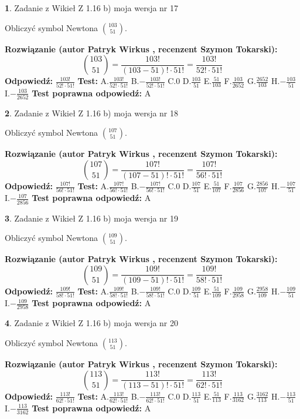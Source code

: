 \documentclass[12pt, a4paper]{article}
\theoremstyle{definition} %
\newtheorem{zad}{}
\newcommand{\zadStart}[1]{\begin{zad}#1\newline}
\newcommand{\zadStop}{\end{zad}}
\newcommand{\rozwStart}[2]{\noindent \textbf{Rozwiązanie (autor #1 , recenzent #2): }\newline}
\newcommand{\rozwStop}{\newline}
\newcommand{\odpStart}{\noindent \textbf{Odpowiedź:}\newline}
\newcommand{\odpStop}{\newline}
\newcommand{\testStart}{\noindent \textbf{Test:}\newline}
\newcommand{\testStop}{\newline}
\newcommand{\kluczStart}{\noindent \textbf{Test poprawna odpowiedź:}\newline}
\newcommand{\kluczStop}{\newline}
\begin{document}
\zadStart{Zadanie z Wikieł Z 1.16 b) moja wersja nr 17}

Obliczyć symbol Newtona ${103 \choose 51}$.
\zadStop
\rozwStart{Patryk Wirkus}{Szymon Tokarski}
$${103 \choose 51} = \frac{103!}{(103-51)! \cdot 51!} = \frac{103!}{52! \cdot 51!}$$
\rozwStop
\odpStart
$\frac{103!}{52! \cdot 51!}$
\odpStop
\testStart
A.$\frac{103!}{52! \cdot 51!}$ B.$-\frac{103!}{52! \cdot 51!}$ C.$0$ D.$\frac{103}{51}$ E.$\frac{51}{103}$
F.$\frac{103}{2652}$ G.$\frac{2652}{103}$
H.$-\frac{103}{51}$
I.$-\frac{103}{2652}$
\testStop
\kluczStart
A
\kluczStop



\zadStart{Zadanie z Wikieł Z 1.16 b) moja wersja nr 18}

Obliczyć symbol Newtona ${107 \choose 51}$.
\zadStop
\rozwStart{Patryk Wirkus}{Szymon Tokarski}
$${107 \choose 51} = \frac{107!}{(107-51)! \cdot 51!} = \frac{107!}{56! \cdot 51!}$$
\rozwStop
\odpStart
$\frac{107!}{56! \cdot 51!}$
\odpStop
\testStart
A.$\frac{107!}{56! \cdot 51!}$ B.$-\frac{107!}{56! \cdot 51!}$ C.$0$ D.$\frac{107}{51}$ E.$\frac{51}{107}$
F.$\frac{107}{2856}$ G.$\frac{2856}{107}$
H.$-\frac{107}{51}$
I.$-\frac{107}{2856}$
\testStop
\kluczStart
A
\kluczStop



\zadStart{Zadanie z Wikieł Z 1.16 b) moja wersja nr 19}

Obliczyć symbol Newtona ${109 \choose 51}$.
\zadStop
\rozwStart{Patryk Wirkus}{Szymon Tokarski}
$${109 \choose 51} = \frac{109!}{(109-51)! \cdot 51!} = \frac{109!}{58! \cdot 51!}$$
\rozwStop
\odpStart
$\frac{109!}{58! \cdot 51!}$
\odpStop
\testStart
A.$\frac{109!}{58! \cdot 51!}$ B.$-\frac{109!}{58! \cdot 51!}$ C.$0$ D.$\frac{109}{51}$ E.$\frac{51}{109}$
F.$\frac{109}{2958}$ G.$\frac{2958}{109}$
H.$-\frac{109}{51}$
I.$-\frac{109}{2958}$
\testStop
\kluczStart
A
\kluczStop



\zadStart{Zadanie z Wikieł Z 1.16 b) moja wersja nr 20}

Obliczyć symbol Newtona ${113 \choose 51}$.
\zadStop
\rozwStart{Patryk Wirkus}{Szymon Tokarski}
$${113 \choose 51} = \frac{113!}{(113-51)! \cdot 51!} = \frac{113!}{62! \cdot 51!}$$
\rozwStop
\odpStart
$\frac{113!}{62! \cdot 51!}$
\odpStop
\testStart
A.$\frac{113!}{62! \cdot 51!}$ B.$-\frac{113!}{62! \cdot 51!}$ C.$0$ D.$\frac{113}{51}$ E.$\frac{51}{113}$
F.$\frac{113}{3162}$ G.$\frac{3162}{113}$
H.$-\frac{113}{51}$
I.$-\frac{113}{3162}$
\testStop
\kluczStart
A
\kluczStop
\end{document}
